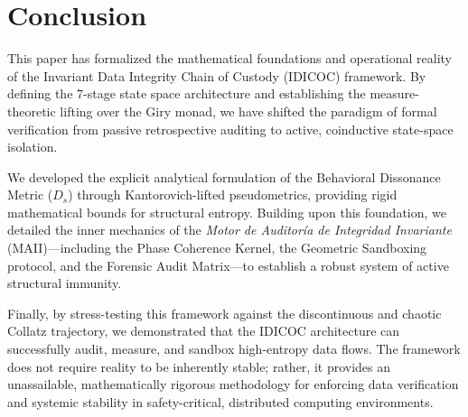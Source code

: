 \documentclass[11pt,a4paper]{article}
\begin{document}
\section{Conclusion}
This paper has formalized the mathematical foundations and operational reality of the Invariant Data Integrity Chain of Custody (IDICOC) framework. By defining the 7-stage state space architecture and establishing the measure-theoretic lifting over the Giry monad, we have shifted the paradigm of formal verification from passive retrospective auditing to active, coinductive state-space isolation. 

We developed the explicit analytical formulation of the Behavioral Dissonance Metric ($D_s$) through Kantorovich-lifted pseudometrics, providing rigid mathematical bounds for structural entropy. Building upon this foundation, we detailed the inner mechanics of the \textit{Motor de Auditoría de Integridad Invariante} (MAII)—including the Phase Coherence Kernel, the Geometric Sandboxing protocol, and the Forensic Audit Matrix—to establish a robust system of active structural immunity. 

Finally, by stress-testing this framework against the discontinuous and chaotic Collatz trajectory, we demonstrated that the IDICOC architecture can successfully audit, measure, and sandbox high-entropy data flows. The framework does not require reality to be inherently stable; rather, it provides an unassailable, mathematically rigorous methodology for enforcing data verification and systemic stability in safety-critical, distributed computing environments.
\end{document}
